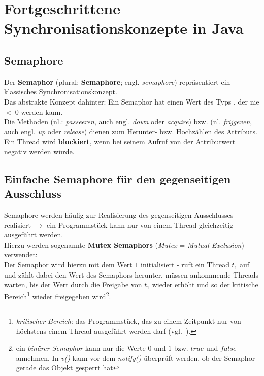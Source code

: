 \section{Fortgeschrittene Synchronisationskonzepte in Java}
\subsection{Semaphore}

Der \textbf{Semaphor} (plural: \textbf{Semaphore}; engl. \textit{semaphore}) repräsentiert ein klassisches Synchronisationskonzept.\\

\noindent
Das abstrakte Konzept dahinter: Ein Semaphor hat einen Wert des Typs , der nie $<\ 0$ werden kann.\\
Die Methoden  (nl.: \textit{passeeren}, auch engl. \textit{down} oder \textit{acquire}) bzw.  (nl. \textit{frijgeven}, auch engl. \textit{up} oder \textit{release}) dienen zum Herunter- bzw. Hochzählen des Attributs.\\

\noindent
Ein Thread wird \textbf{blockiert}, wenn bei seinem Aufruf von  der Attributwert negativ werden würde.

\subsection{Einfache Semaphore für den gegenseitigen Ausschluss}

Semaphore werden häufig zur Realisierung des gegenseitigen Ausschlusses realisiert $\rightarrow$ ein Programmstück kann nur von einem Thread gleichzeitig ausgeführt werden.\\

\noindent
Hierzu werden sogenannte \textbf{Mutex Semaphors} (\textit{Mutex} = \textit{Mutual Exclusion}) verwendet:\\
Der Semaphor wird hierzu mit dem Wert $1$ initialisiert - ruft ein Thread $t_1$  auf und zählt dabei den Wert des Semaphors herunter, müssen ankommende Threads warten, bis der Wert durch die Freigabe von $t_1$ wieder erhöht und so der kritische Bereich\footnote{
    \textit{kritischer Bereich}: das Programmstück, das zu einem Zeitpunkt nur von höchstens einem Thread ausgeführt werden darf (vgl.~\cite[102]{Oec22}).
} wieder freigegeben wird\footnote{ein \textit{binärer Semaphor} kann nur die Werte $0$ und $1$ bzw. $true$ und $false$ annehmen. In \textit{v()} kann vor dem \textit{notify()} überprüft werden, ob der Semaphor gerade das Objekt gesperrt hat}.\\

